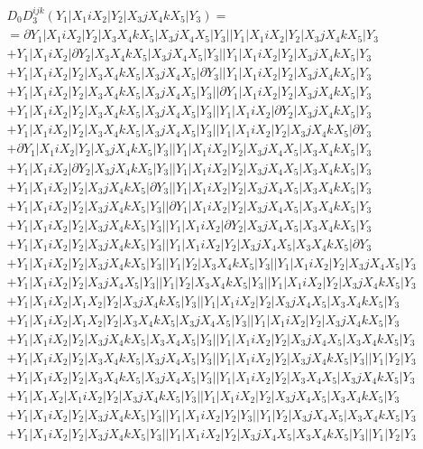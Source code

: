 \documentclass{article}[12pt]
\begin{document}
 
\begin{align*}
& D_0 D_3^{ijk}(Y_1|X_1iX_2|Y_2|X_3jX_4kX_5|Y_3) =\\
& =\partial Y_1|X_1iX_2|Y_2|X_3X_4kX_5|X_3jX_4X_5|Y_3||Y_1|X_1iX_2|Y_2|X_3jX_4kX_5|Y_3\\
& +Y_1|X_1iX_2|\partial Y_2|X_3X_4kX_5|X_3jX_4X_5|Y_3||Y_1|X_1iX_2|Y_2|X_3jX_4kX_5|Y_3\\
& +Y_1|X_1iX_2|Y_2|X_3X_4kX_5|X_3jX_4X_5|\partial Y_3||Y_1|X_1iX_2|Y_2|X_3jX_4kX_5|Y_3\\
& +Y_1|X_1iX_2|Y_2|X_3X_4kX_5|X_3jX_4X_5|Y_3||\partial Y_1|X_1iX_2|Y_2|X_3jX_4kX_5|Y_3\\
& +Y_1|X_1iX_2|Y_2|X_3X_4kX_5|X_3jX_4X_5|Y_3||Y_1|X_1iX_2|\partial Y_2|X_3jX_4kX_5|Y_3\\
& +Y_1|X_1iX_2|Y_2|X_3X_4kX_5|X_3jX_4X_5|Y_3||Y_1|X_1iX_2|Y_2|X_3jX_4kX_5|\partial Y_3\\
& +\partial Y_1|X_1iX_2|Y_2|X_3jX_4kX_5|Y_3||Y_1|X_1iX_2|Y_2|X_3jX_4X_5|X_3X_4kX_5|Y_3\\
& +Y_1|X_1iX_2|\partial Y_2|X_3jX_4kX_5|Y_3||Y_1|X_1iX_2|Y_2|X_3jX_4X_5|X_3X_4kX_5|Y_3\\
& +Y_1|X_1iX_2|Y_2|X_3jX_4kX_5|\partial Y_3||Y_1|X_1iX_2|Y_2|X_3jX_4X_5|X_3X_4kX_5|Y_3\\
& +Y_1|X_1iX_2|Y_2|X_3jX_4kX_5|Y_3||\partial Y_1|X_1iX_2|Y_2|X_3jX_4X_5|X_3X_4kX_5|Y_3\\
& +Y_1|X_1iX_2|Y_2|X_3jX_4kX_5|Y_3||Y_1|X_1iX_2|\partial Y_2|X_3jX_4X_5|X_3X_4kX_5|Y_3\\
& +Y_1|X_1iX_2|Y_2|X_3jX_4kX_5|Y_3||Y_1|X_1iX_2|Y_2|X_3jX_4X_5|X_3X_4kX_5|\partial Y_3\\
& +Y_1|X_1iX_2|Y_2|X_3jX_4kX_5|Y_3||Y_1|Y_2|X_3X_4kX_5|Y_3||Y_1|X_1iX_2|Y_2|X_3jX_4X_5|Y_3\\ 
 & +Y_1|X_1iX_2|Y_2|X_3jX_4X_5|Y_3||Y_1|Y_2|X_3X_4kX_5|Y_3||Y_1|X_1iX_2|Y_2|X_3jX_4kX_5|Y_3\\ 
 & +Y_1|X_1iX_2|X_1X_2|Y_2|X_3jX_4kX_5|Y_3||Y_1|X_1iX_2|Y_2|X_3jX_4X_5|X_3X_4kX_5|Y_3\\ 
 & +Y_1|X_1iX_2|X_1X_2|Y_2|X_3X_4kX_5|X_3jX_4X_5|Y_3||Y_1|X_1iX_2|Y_2|X_3jX_4kX_5|Y_3\\ 
 & +Y_1|X_1iX_2|Y_2|X_3jX_4kX_5|X_3X_4X_5|Y_3||Y_1|X_1iX_2|Y_2|X_3jX_4X_5|X_3X_4kX_5|Y_3\\ 
 & +Y_1|X_1iX_2|Y_2|X_3X_4kX_5|X_3jX_4X_5|Y_3||Y_1|X_1iX_2|Y_2|X_3jX_4kX_5|Y_3||Y_1|Y_2|Y_3\\ 
 & +Y_1|X_1iX_2|Y_2|X_3X_4kX_5|X_3jX_4X_5|Y_3||Y_1|X_1iX_2|Y_2|X_3X_4X_5|X_3jX_4kX_5|Y_3\\ 
 & +Y_1|X_1X_2|X_1iX_2|Y_2|X_3jX_4kX_5|Y_3||Y_1|X_1iX_2|Y_2|X_3jX_4X_5|X_3X_4kX_5|Y_3\\ 
 & +Y_1|X_1iX_2|Y_2|X_3jX_4kX_5|Y_3||Y_1|X_1iX_2|Y_2|Y_3||Y_1|Y_2|X_3jX_4X_5|X_3X_4kX_5|Y_3\\ 
 & +Y_1|X_1iX_2|Y_2|X_3jX_4kX_5|Y_3||Y_1|X_1iX_2|Y_2|X_3jX_4X_5|X_3X_4kX_5|Y_3||Y_1|Y_2|Y_3\\ 
 \end{align*}
\end{document}
